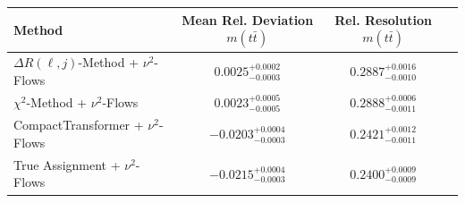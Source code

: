     \begin{tabular}{lccc}
        \toprule
        Method & Mean Rel. Deviation $m(t\bar{t})$ & Rel. Resolution $m(t\bar{t})$ \\
        \midrule
        $\Delta R(\ell,j)$-Method + $\nu^2$-Flows & $0.0025^{+0.0002}_{-0.0003}$ & $0.2887^{+0.0016}_{-0.0010}$ \\
        $\chi^2$-Method + $\nu^2$-Flows & $0.0023^{+0.0005}_{-0.0005}$ & $0.2888^{+0.0006}_{-0.0011}$ \\
        CompactTransformer + $\nu^2$-Flows & $-0.0203^{+0.0004}_{-0.0003}$ & $0.2421^{+0.0012}_{-0.0011}$ \\
        True Assignment + $\nu^2$-Flows & $-0.0215^{+0.0004}_{-0.0003}$ & $0.2400^{+0.0009}_{-0.0009}$ \\
        \bottomrule
    \end{tabular}